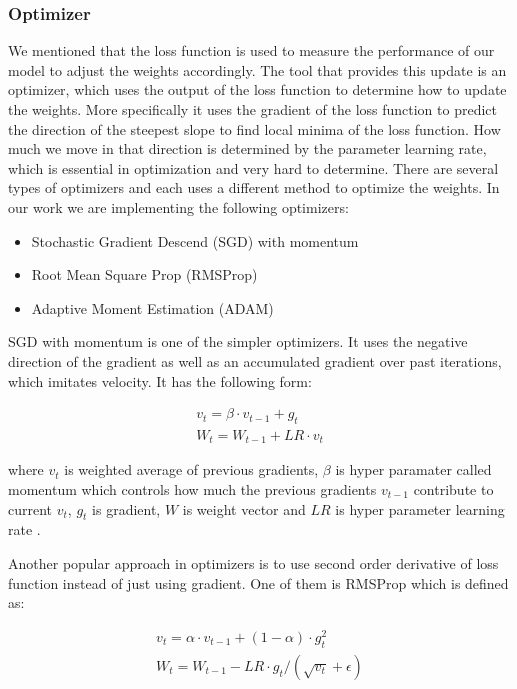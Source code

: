 \subsubsection{Optimizer}

We mentioned that the loss function is used to measure the performance of our model to adjust the weights accordingly. The tool that provides this update is an optimizer, which uses the output of the loss function to determine how to update the weights. More specifically it uses the gradient of the loss function to predict the direction of the steepest slope to find local minima of the loss function. How much we move in that direction is determined by the parameter learning rate, which is essential in optimization and very hard to determine. 
There are several types of optimizers and each uses a different method to optimize the weights. In our work we are implementing the following optimizers:
\begin{itemize}
    \item Stochastic Gradient Descend (SGD) with momentum 
    \item Root Mean Square Prop (RMSProp)
    \item Adaptive Moment Estimation (ADAM) 
\end{itemize}

SGD with momentum is one of the simpler optimizers. It uses the negative direction of the gradient as well as an accumulated gradient over past iterations, which imitates velocity. It has the following form: 

\begin{equation}
\begin{split}
    v_t = \beta \cdot v_{t-1} + g_t \\
    W_t = W_{t-1} + LR \cdot v_t
\end{split}
\end{equation}

where $v_t$ is weighted average of previous gradients, $\beta$ is hyper paramater called momentum which controls how much the previous gradients $v_{t-1}$ contribute to current $v_t$, $g_t$ is gradient, $W$ is weight vector and $LR$ is hyper parameter learning rate \cite{pytorchoptim}.

Another popular approach in optimizers is to use second order derivative of loss function instead of just using gradient. One of them is RMSProp which is defined as:

\begin{equation}
\begin{split}
    v_t = \alpha \cdot v_{t-1} + (1 - \alpha) \cdot g_t^2 \\
    W_t = W_{t-1} - LR \cdot g_t / (\sqrt{v_t} + \epsilon) 
\end{split}
\end{equation}

